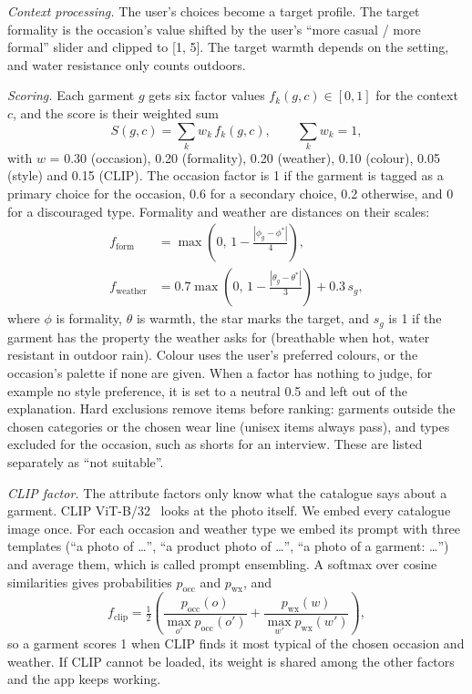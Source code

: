 \documentclass{article}
\begin{document}
\emph{Context processing.} The user's choices become a target profile. The target formality is the
occasion's value shifted by the user's ``more casual / more formal'' slider and clipped to [1, 5]. The
target warmth depends on the setting, and water resistance only counts outdoors.

\emph{Scoring.} Each garment $g$ gets six factor values $f_k(g,c)\in[0,1]$ for the context $c$, and the
score is their weighted sum
\begin{equation}
S(g,c)=\sum_{k} w_k\, f_k(g,c),\qquad \sum_k w_k = 1,
\end{equation}
with $w$ = 0.30 (occasion), 0.20 (formality), 0.20 (weather), 0.10 (colour), 0.05 (style) and 0.15 (CLIP).
The occasion factor is 1 if the garment is tagged as a primary choice for the occasion, 0.6 for a
secondary choice, 0.2 otherwise, and 0 for a discouraged type. Formality and weather are distances on
their scales:
\begin{align}
f_\text{form} &= \max\!\left(0,\,1-\tfrac{|\phi_g-\phi^*|}{4}\right),\\
f_\text{weather} &= 0.7\max\!\left(0,\,1-\tfrac{|\theta_g-\theta^*|}{3}\right)+0.3\,s_g,
\end{align}
where $\phi$ is formality, $\theta$ is warmth, the star marks the target, and $s_g$ is 1 if the
garment has the property the weather asks for (breathable when hot, water resistant in outdoor rain).
Colour uses the user's preferred colours, or the occasion's palette if none are given. When a factor
has nothing to judge, for example no style preference, it is set to a neutral 0.5 and left out of the
explanation. Hard exclusions remove items before ranking: garments outside the chosen categories or
the chosen wear line (unisex items always pass), and types excluded for the occasion, such as shorts
for an interview. These are listed separately as ``not suitable''.

\emph{CLIP factor.} The attribute factors only know what the catalogue says about a garment. CLIP
ViT-B/32~\cite{clip} looks at the photo itself. We embed every catalogue image once. For each occasion
and weather type we embed its prompt with three templates (``a photo of \ldots'', ``a product photo of
\ldots'', ``a photo of a garment: \ldots'') and average them, which is called prompt ensembling. A
softmax over cosine similarities gives probabilities $p_\text{occ}$ and $p_\text{wx}$, and
\begin{equation}
f_\text{clip}=\tfrac12\left(\frac{p_\text{occ}(o)}{\max_{o'} p_\text{occ}(o')}+\frac{p_\text{wx}(w)}{\max_{w'} p_\text{wx}(w')}\right),
\end{equation}
so a garment scores 1 when CLIP finds it most typical of the chosen occasion and weather. If CLIP
cannot be loaded, its weight is shared among the other factors and the app keeps working.
\end{document}
